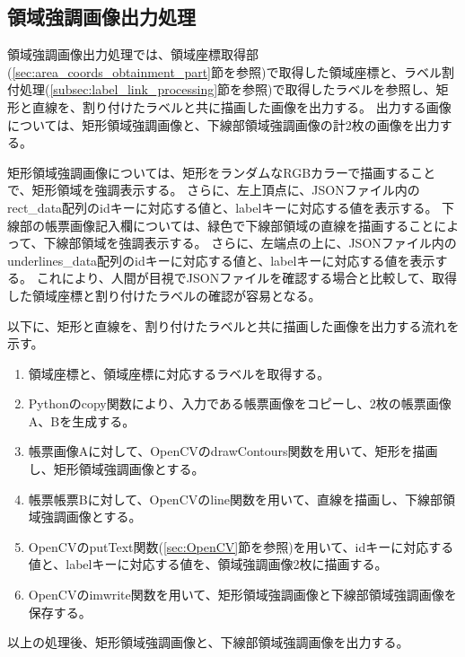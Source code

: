 \subsection{領域強調画像出力処理}\label{subsec:area_highlighted_image_output_processing}
領域強調画像出力処理では、領域座標取得部(\ref{sec:area_coords_obtainment_part}節を参照)で取得した領域座標と、ラベル割付処理(\ref{subsec:label_link_processing}節を参照)で取得したラベルを参照し、矩形と直線を、割り付けたラベルと共に描画した画像を出力する。
出力する画像については、矩形領域強調画像と、下線部領域強調画像の計2枚の画像を出力する。

矩形領域強調画像については、矩形をランダムなRGBカラーで描画することで、矩形領域を強調表示する。
さらに、左上頂点に、JSONファイル内のrect\_data配列のidキーに対応する値と、labelキーに対応する値を表示する。
下線部の帳票画像記入欄については、緑色で下線部領域の直線を描画することによって、下線部領域を強調表示する。
さらに、左端点の上に、JSONファイル内のunderlines\_data配列のidキーに対応する値と、labelキーに対応する値を表示する。
これにより、人間が目視でJSONファイルを確認する場合と比較して、取得した領域座標と割り付けたラベルの確認が容易となる。

以下に、矩形と直線を、割り付けたラベルと共に描画した画像を出力する流れを示す。

\begin{enumerate}
    \item 領域座標と、領域座標に対応するラベルを取得する。
    \item Pythonのcopy関数により、入力である帳票画像をコピーし、2枚の帳票画像A、Bを生成する。
    \item 帳票画像Aに対して、OpenCVのdrawContours関数を用いて、矩形を描画し、矩形領域強調画像とする。
    \item 帳票帳票Bに対して、OpenCVのline関数を用いて、直線を描画し、下線部領域強調画像とする。
    \item OpenCVのputText関数(\ref{sec:OpenCV}節を参照)を用いて、idキーに対応する値と、labelキーに対応する値を、領域強調画像2枚に描画する。
    \item OpenCVのimwrite関数を用いて、矩形領域強調画像と下線部領域強調画像を保存する。
\end{enumerate}

以上の処理後、矩形領域強調画像と、下線部領域強調画像を出力する。
